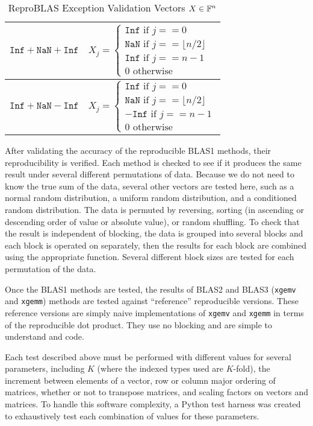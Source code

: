 \begin{table}[!htbp]
\begin{tabular}{ | l |  l |}
            $\texttt{Inf} + \texttt{NaN} + \texttt{Inf}$ & $X_j = \begin{cases} \texttt{Inf} \text{ if } j == 0 \\ \texttt{NaN} \text{ if } j == \lfloor n/2 \rfloor \\ \texttt{Inf} \text{ if } j == n - 1 \\ 0 \text{ otherwise} \end{cases}$\\ \hline
            $\texttt{Inf} + \texttt{NaN} - \texttt{Inf}$ & $X_j = \begin{cases} \texttt{Inf} \text{ if } j == 0 \\ \texttt{NaN} \text{ if } j == \lfloor n/2 \rfloor \\ -\texttt{Inf} \text{ if } j == n - 1 \\ 0 \text{ otherwise} \end{cases}$\\ \hline
        \end{tabular}
        \caption{ReproBLAS Exception Validation Vectors $X \in \mathbb{F}^n$}
        \label{tbl:validateinfblas1data}
    \end{table}

  After validating the accuracy of the reproducible BLAS1 methods, their reproducibility is verified. Each method is checked to see if it produces the same result under several different permutations of data. Because we do not need to know the true sum of the data, several other vectors are tested here, such as a normal random distribution, a uniform random distribution, and a conditioned random distribution. The data is permuted by reversing, sorting (in ascending or descending order of value or absolute value), or random shuffling. To check that the result is independent of blocking, the data is grouped into several blocks and each block is operated on separately, then the results for each block are combined using the appropriate function. Several different block sizes are tested for each permutation of the data.

  Once the BLAS1 methods are tested, the results of BLAS2 and BLAS3 (\texttt{xgemv} and \texttt{xgemm}) methods are tested against ``reference'' reproducible versions. These reference versions are simply naive implementations of \texttt{xgemv} and \texttt{xgemm} in terms of the reproducible dot product. They use no blocking and are simple to understand and code.

  Each test described above must be performed with different values for several parameters, including $K$ (where the indexed types used are $K$-fold), the increment between elements of a vector, row or column major ordering of matrices, whether or not to transpose matrices, and scaling factors on vectors and matrices. To handle this software complexity, a Python test harness was created to exhaustively test each combination of values for these parameters.
